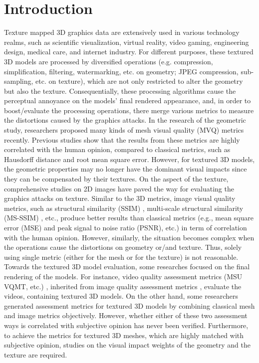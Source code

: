 \section{Introduction}
Texture mapped 3D graphics data are extensively used in various technology realms, such as scientific visualization, virtual reality, video gaming, engineering design, medical care, and internet industry. For different purposes, these textured 3D models are processed by diversified operations (e.g. compression, simplification, filtering, watermarking, etc. on geometry; JPEG compression, sub-sampling, etc. on texture), which are not only restricted to alter the geometry but also the texture. Consequentially, these processing algorithms cause the perceptual annoyance on the models’ final rendered appearance, and, in order to boost/evaluate the processing operations, there merge various metrics to measure the distortions caused by the graphics attacks. In the research of the geometric study, researchers \cite{Lavou__2011}\cite{V_a_2012}\cite{Wang_2011} proposed many kinds of mesh visual quality (MVQ) metrics recently. Previous studies \cite{Corsini_2013}\cite{Guo_2015} show that the results from these metrics are highly correlated with the human opinion, compared to classical metrics, such as Hausdorff distance and root mean square error. However, for textured 3D models, the geometric properties may no longer have the dominant visual impacts since they can be compensated by their textures.  On the aspect of the texture, comprehensive studies on 2D images have paved the way for evaluating the graphics attacks on texture.  Similar to the 3D metrics, image visual quality metrics, such as structural similarity (SSIM) \cite{Wang_2004}, multi-scale structural similarity (MS-SSIM) \cite{Zhou_Wang_2011}, etc., produce better results than classical metrics (e.g., mean square error (MSE) and peak signal to noise ratio (PSNR), etc.) in term of correlation with the human opinion. However, similarly, the situation becomes complex when the operations cause the distortions on geometry or/and texture. Thus, solely using single metric (either for the mesh or for the texture) is not reasonable. Towards the textured 3D model evaluation, some researches focused on the final rendering of the models. For instance, video quality assessment metrics (MSU VQMT, etc.)  \cite{Seshadrinathan_2010}, inherited from image quality assessment metrics \cite{Wang_2006}, evaluate the videos, containing textured 3D models.  On the other hand, some researchers \cite{Tian_2004} generated assessment metrics for textured 3D models by combining classical mesh and image metrics objectively. However, whether either of these two assessment ways is correlated with subjective opinion has never been verified. Furthermore, to achieve the metrics for textured 3D meshes, which are highly matched with subjective opinion, studies on the visual impact weights of the geometry and the texture are required.\\
